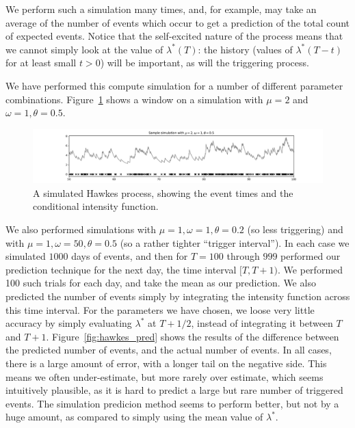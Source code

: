 \documentclass[twoside,a4paper]{article}
\theoremstyle{plain}
\theoremstyle{definition}
\begin{document}
We perform such a simulation many times, and, for example, may take an average of the number
of events which occur to get a prediction of the total count of expected events.  Notice
that the self-excited nature of the process means that we cannot simply look at the
value of $\lambda^*(T)$: the history (values of $\lambda^*(T-t)$ for at least small $t>0$)
will be important, as will the triggering process.

We have performed this compute simulation for a number of different parameter combinations.
Figure~\ref{fig:hawkes_sample} shows a window on a simulation with $\mu=2$ and $\omega=1,
\theta=0.5$.

\begin{figure}
  \includegraphics[width=\textwidth]{../notebooks/hawkes_sample.pdf}
  \caption{A simulated Hawkes process, showing the event times and the conditional intensity
function.}
  \label{fig:hawkes_sample}
\end{figure}

We also performed simulations with $\mu=1,\omega=1,\theta=0.2$ (so less triggering) and
with $\mu=1,\omega=50,\theta=0.5$ (so a rather tighter ``trigger interval'').  In each case
we simulated $1000$ days of events, and then for $T=100$ through $999$ performed our prediction
technique for the next day, the time interval $[T,T+1)$.  We performed 100 such trials for
each day, and take the mean as our prediction.  We also predicted the number of
events simply by integrating the intensity function across this time interval.  For the
parameters we have chosen, we loose very little accuracy by simply evaluating $\lambda^*$ at
$T+1/2$, instead of integrating it between $T$ and $T+1$.
Figure~\ref{fig:hawkes_pred} shows the results of the difference between the predicted
number of events, and the actual number of events.  In all cases, there is a large amount
of error, with a longer tail on the negative side.  This means we often under-estimate, but
more rarely over estimate, which seems intuitively plausible, as it is hard to predict a
large but rare number of triggered events.  The simulation predicion method seems to
perform better, but not by a huge amount, as compared to simply using the mean value
of $\lambda^*$.
\end{document}
